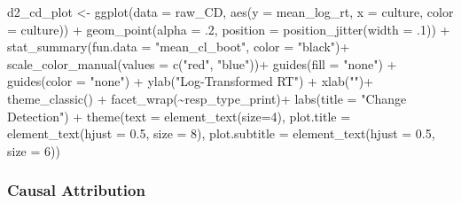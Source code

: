 \documentclass[
]{article}
\newenvironment{Shaded}{\begin{snugshade}}{\end{snugshade}}
\newcommand{\AttributeTok}[1]{\textcolor[rgb]{0.77,0.63,0.00}{#1}}
\newcommand{\DecValTok}[1]{\textcolor[rgb]{0.00,0.00,0.81}{#1}}
\newcommand{\FloatTok}[1]{\textcolor[rgb]{0.00,0.00,0.81}{#1}}
\newcommand{\FunctionTok}[1]{\textcolor[rgb]{0.00,0.00,0.00}{#1}}
\newcommand{\NormalTok}[1]{#1}
\newcommand{\OtherTok}[1]{\textcolor[rgb]{0.56,0.35,0.01}{#1}}
\newcommand{\SpecialCharTok}[1]{\textcolor[rgb]{0.00,0.00,0.00}{#1}}
\newcommand{\StringTok}[1]{\textcolor[rgb]{0.31,0.60,0.02}{#1}}
\begin{document}
\begin{Shaded}
\begin{Highlighting}[]
\NormalTok{d2\_cd\_plot }\OtherTok{\textless{}{-}} \FunctionTok{ggplot}\NormalTok{(}\AttributeTok{data =}\NormalTok{ raw\_CD, }
       \FunctionTok{aes}\NormalTok{(}\AttributeTok{y =}\NormalTok{ mean\_log\_rt, }\AttributeTok{x =}\NormalTok{ culture, }\AttributeTok{color =}\NormalTok{ culture)) }\SpecialCharTok{+}
\FunctionTok{geom\_point}\NormalTok{(}\AttributeTok{alpha =}\NormalTok{ .}\DecValTok{2}\NormalTok{, }\AttributeTok{position =} \FunctionTok{position\_jitter}\NormalTok{(}\AttributeTok{width =}\NormalTok{ .}\DecValTok{1}\NormalTok{)) }\SpecialCharTok{+} 
                    \FunctionTok{stat\_summary}\NormalTok{(}\AttributeTok{fun.data =} \StringTok{"mean\_cl\_boot"}\NormalTok{, }\AttributeTok{color =} \StringTok{"black"}\NormalTok{)}\SpecialCharTok{+}
\FunctionTok{scale\_color\_manual}\NormalTok{(}\AttributeTok{values =} \FunctionTok{c}\NormalTok{(}\StringTok{"red"}\NormalTok{, }\StringTok{"blue"}\NormalTok{))}\SpecialCharTok{+}
\FunctionTok{guides}\NormalTok{(}\AttributeTok{fill =} \StringTok{"none"}\NormalTok{) }\SpecialCharTok{+}
\FunctionTok{guides}\NormalTok{(}\AttributeTok{color =} \StringTok{"none"}\NormalTok{) }\SpecialCharTok{+}
\FunctionTok{ylab}\NormalTok{(}\StringTok{"Log{-}Transformed RT"}\NormalTok{) }\SpecialCharTok{+} 
\FunctionTok{xlab}\NormalTok{(}\StringTok{""}\NormalTok{)}\SpecialCharTok{+}
\FunctionTok{theme\_classic}\NormalTok{() }\SpecialCharTok{+}
  \FunctionTok{facet\_wrap}\NormalTok{(}\SpecialCharTok{\textasciitilde{}}\NormalTok{resp\_type\_print)}\SpecialCharTok{+}
  \FunctionTok{labs}\NormalTok{(}\AttributeTok{title =} \StringTok{"Change Detection"}\NormalTok{)  }\SpecialCharTok{+} 
  \FunctionTok{theme}\NormalTok{(}\AttributeTok{text =} \FunctionTok{element\_text}\NormalTok{(}\AttributeTok{size=}\DecValTok{4}\NormalTok{),}
      \AttributeTok{plot.title =} \FunctionTok{element\_text}\NormalTok{(}\AttributeTok{hjust =} \FloatTok{0.5}\NormalTok{, }\AttributeTok{size =} \DecValTok{8}\NormalTok{), }
      \AttributeTok{plot.subtitle =} \FunctionTok{element\_text}\NormalTok{(}\AttributeTok{hjust =} \FloatTok{0.5}\NormalTok{, }\AttributeTok{size =} \DecValTok{6}\NormalTok{))  }
\end{Highlighting}
\end{Shaded}

\hypertarget{causal-attribution}{%
\subsubsection{Causal Attribution}\label{causal-attribution}}
\end{document}
